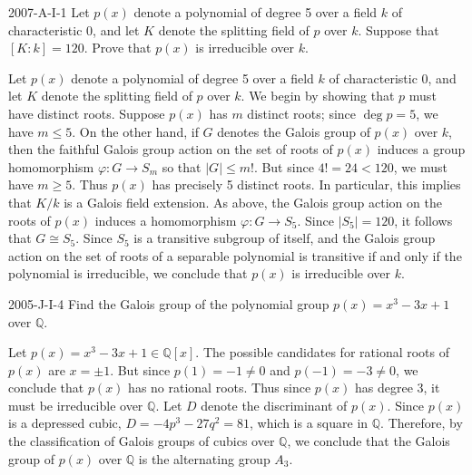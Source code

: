 \documentclass{article}
\begin{document}
	\begin{prb}{2007-A-I-1}
		Let $p(x)$ denote a polynomial of degree 5 over a field $k$ of characteristic $0$, and let $K$ denote the splitting field of $p$ over $k$. Suppose that $[K: k] = 120$. Prove that $p(x)$ is irreducible over $k$. 
	\end{prb}
	Let $p(x)$ denote a polynomial of degree 5 over a field $k$ of characteristic 0, and let $K$ denote the splitting field of $p$ over $k$. We begin by showing that $p$ must have distinct roots. Suppose $p(x)$ has $m$ distinct roots; since $\deg{p} = 5$, we have $m \leq 5$. On the other hand, if $G$ denotes the Galois group of $p(x)$ over $k$, then the faithful Galois group action on the set of roots of $p(x)$ induces a group homomorphism $\varphi: G \to S_{m}$ so that $|G| \leq m!$. But since $4! = 24 < 120$, we must have $m \geq 5$. Thus $p(x)$ has precisely 5 distinct roots. In particular, this implies that $K/k$ is a Galois field extension. As above, the Galois group action on the roots of $p(x)$ induces a homomorphism $\varphi: G\to S_{5}$. Since $|S_{5}| = 120$, it follows that $G \cong S_{5}$. Since $S_{5}$ is a transitive subgroup of itself, and the Galois group action on the set of roots of a separable polynomial is transitive if and only if the polynomial is irreducible, we conclude that $p(x)$ is irreducible over $k$. 
	
	\begin{prb}{2005-J-I-4}
		Find the Galois group of the polynomial group $p(x) = x^{3} - 3x + 1$ over $\mathbb{Q}$. 
	\end{prb}
	Let $p(x) = x^{3} - 3x + 1 \in \mathbb{Q}[x]$. The possible candidates for rational roots of $p(x)$ are $x = \pm 1$. But since $p(1) = -1 \neq 0$ and $p(-1) = -3 \neq 0$, we conclude that $p(x)$ has no rational roots. Thus since $p(x)$ has degree 3, it must be irreducible over $\mathbb{Q}$. Let $D$ denote the discriminant of $p(x)$. Since $p(x)$ is a depressed cubic, $D= -4p^{3} - 27q^{2} = 81$, which is a square in $\mathbb{Q}$. Therefore, by the classification of Galois groups of cubics over $\mathbb{Q}$, we conclude that the Galois group of $p(x)$ over $\mathbb{Q}$ is the alternating group $A_{3}$. 
	
\end{document}
